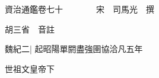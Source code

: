 






























































資治通鑑卷七十　　　　宋　司馬光　撰

胡三省　音註

魏紀二|{
	起昭陽單閼盡強圉協洽凡五年}


世祖文皇帝下

